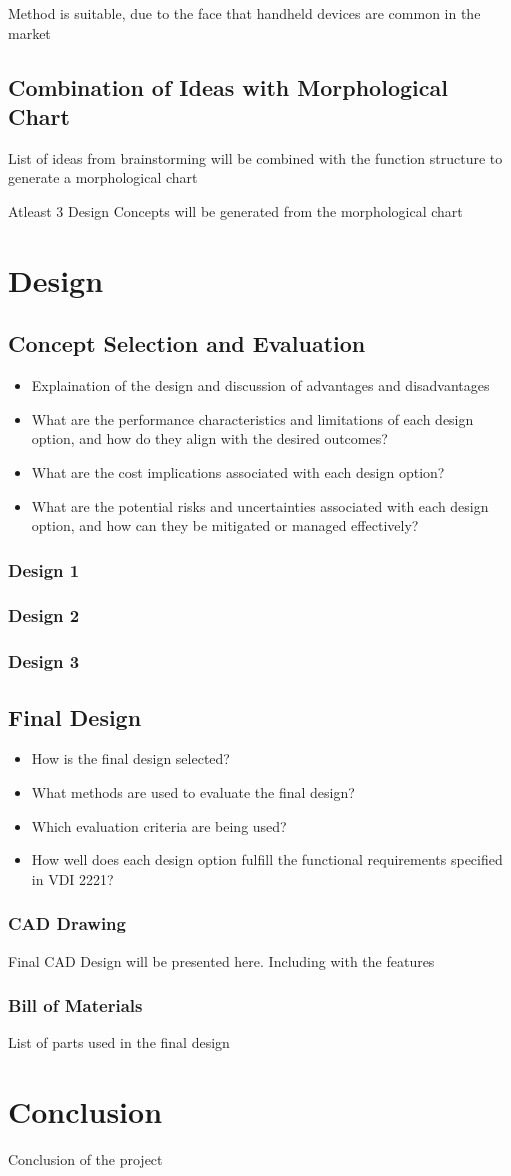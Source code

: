 Method is suitable, due to the face that handheld devices are common in the market
\section{Combination of Ideas with Morphological Chart}
List of ideas from brainstorming will be combined with the function structure to generate a morphological chart

Atleast 3 Design Concepts will be generated from the morphological chart

\chapter{Design}
\section{Concept Selection and Evaluation}
\begin{itemize}
    \item Explaination of the design and discussion of advantages and disadvantages
    \item What are the performance characteristics and limitations of each design option, and how do they align with the desired outcomes?
    \item What are the cost implications associated with each design option?
    \item What are the potential risks and uncertainties associated with each design option, and how can they be mitigated or managed effectively?
\end{itemize}
\subsection{Design 1}
\subsection{Design 2}
\subsection{Design 3}

\section{Final Design}
\begin{itemize}
    \item How is the final design selected?
    \item What methods are used to evaluate the final design?
    \item Which evaluation criteria are being used?
    \item How well does each design option fulfill the functional requirements specified in VDI 2221?
\end{itemize}
\subsection{CAD Drawing}
Final CAD Design will be presented here.
Including with the features
\subsection{Bill of Materials}
List of parts used in the final design

\chapter{Conclusion}
Conclusion of the project